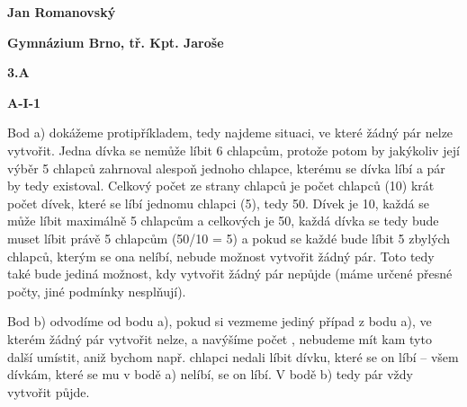 \documentclass{article}
\title{\vspace{-2cm}\vspace{-1.7cm}}
\date{}
\author{}
\begin{document}
\maketitle
\noindent \textbf{Jan Romanovský}

\noindent \textbf{Gymnázium Brno, tř. Kpt. Jaroše}

\noindent \textbf{3.A}

\noindent \textbf{A-\textrm{I}-1}

\textbf{ }

Bod a) dokážeme protipříkladem, tedy najdeme situaci, ve které žádný pár nelze vytvořit. Jedna dívka se nemůže líbit 6 chlapcům, protože potom by jakýkoliv její výběr 5 chlapců zahrnoval alespoň jednoho chlapce, kterému se dívka líbí a pár by tedy existoval. Celkový počet  ze strany chlapců je počet chlapců (10) krát počet dívek, které se líbí jednomu chlapci (5), tedy 50. Dívek je 10, každá se může líbit maximálně 5 chlapcům a celkových  je 50, každá dívka se tedy bude muset líbit právě 5 chlapcům (50/10 = 5) a pokud se každé bude líbit 5 zbylých chlapců, kterým se ona nelíbí, nebude možnost vytvořit žádný pár. Toto tedy také bude jediná možnost, kdy vytvořit žádný pár nepůjde (máme určené přesné počty, jiné podmínky nesplňují).

Bod b) odvodíme od bodu a), pokud si vezmeme jediný případ z bodu a), ve kterém žádný pár vytvořit nelze, a navýšíme počet , nebudeme mít kam tyto další umístit, aniž bychom např. chlapci nedali líbit dívku, které se on líbí -- všem dívkám, které se mu v bodě a) nelíbí, se on líbí. V bodě b) tedy pár vždy vytvořit půjde.
\end{document}
